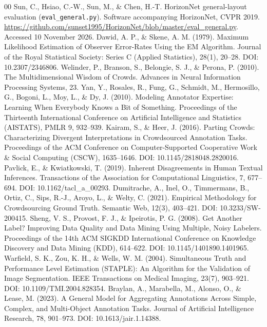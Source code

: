 \documentclass[final,5p,twocolumn]{elsarticle}
\begin{document}
\begin{thebibliography}{00}
 Sun, C., Hsiao, C.-W., Sun, M., \& Chen, H.-T. HorizonNet general-layout evaluation (\texttt{eval\_general.py}). Software accompanying HorizonNet, CVPR 2019. \url{https://github.com/sunset1995/HorizonNet/blob/master/eval_general.py}. Accessed 10 November 2026.
 Dawid, A. P., \& Skene, A. M. (1979). Maximum Likelihood Estimation of Observer Error-Rates Using the EM Algorithm. Journal of the Royal Statistical Society: Series C (Applied Statistics), 28(1), 20--28. DOI: 10.2307/2346806.
 Welinder, P., Branson, S., Belongie, S. J., \& Perona, P. (2010). The Multidimensional Wisdom of Crowds. Advances in Neural Information Processing Systems, 23.
 Yan, Y., Rosales, R., Fung, G., Schmidt, M., Hermosillo, G., Bogoni, L., Moy, L., \& Dy, J. (2010). Modeling Annotator Expertise: Learning When Everybody Knows a Bit of Something. Proceedings of the Thirteenth International Conference on Artificial Intelligence and Statistics (AISTATS), PMLR 9, 932--939.
 Kairam, S., \& Heer, J. (2016). Parting Crowds: Characterizing Divergent Interpretations in Crowdsourced Annotation Tasks. Proceedings of the ACM Conference on Computer-Supported Cooperative Work \& Social Computing (CSCW), 1635--1646. DOI: 10.1145/2818048.2820016.
 Pavlick, E., \& Kwiatkowski, T. (2019). Inherent Disagreements in Human Textual Inferences. Transactions of the Association for Computational Linguistics, 7, 677--694. DOI: 10.1162/tacl\_a\_00293.
 Dumitrache, A., Inel, O., Timmermans, B., Ortiz, C., Sips, R.-J., Aroyo, L., \& Welty, C. (2021). Empirical Methodology for Crowdsourcing Ground Truth. Semantic Web, 12(3), 403--421. DOI: 10.3233/SW-200415.
 Sheng, V. S., Provost, F. J., \& Ipeirotis, P. G. (2008). Get Another Label? Improving Data Quality and Data Mining Using Multiple, Noisy Labelers. Proceedings of the 14th ACM SIGKDD International Conference on Knowledge Discovery and Data Mining (KDD), 614--622. DOI: 10.1145/1401890.1401965.
 Warfield, S. K., Zou, K. H., \& Wells, W. M. (2004). Simultaneous Truth and Performance Level Estimation (STAPLE): An Algorithm for the Validation of Image Segmentation. IEEE Transactions on Medical Imaging, 23(7), 903--921. DOI: 10.1109/TMI.2004.828354.
 Braylan, A., Marabella, M., Alonso, O., \& Lease, M. (2023). A General Model for Aggregating Annotations Across Simple, Complex, and Multi-Object Annotation Tasks. Journal of Artificial Intelligence Research, 78, 901--973. DOI: 10.1613/jair.1.14388.

\end{thebibliography}
\end{document}
